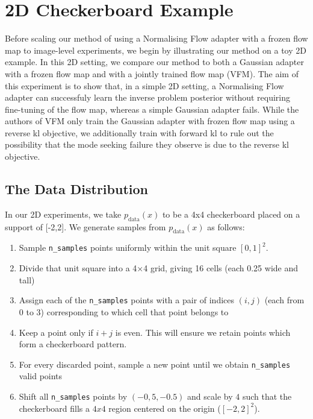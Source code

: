 \documentclass[12pt,a4paper]{report}
\begin{document}
\section{2D Checkerboard Example}
Before scaling our method of using a Normalising Flow adapter with a frozen flow map to image-level experiments, we begin by illustrating our method on a toy 2D example. 
In this 2D setting, we compare our method to both a Gaussian adapter with a frozen flow map and with a jointly trained flow map (VFM). 
The aim of this experiment is to show that, in a simple 2D setting, a Normalising Flow adapter can successfuly learn the inverse problem posterior without requiring fine-tuning of the flow map, whereas a simple Gaussian adapter fails. 
While the authors of VFM only train the Gaussian adapter with frozen flow map using a reverse kl objective, we additionally train with forward kl to rule out the possibility that the mode seeking failure they observe is due to the reverse kl objective. 

\subsection{The Data Distribution}
In our 2D experiments, we take $p_\text{data}(x)$ to be a 4x4 checkerboard placed on a support of [-2,2]. 
We generate samples from $p_\text{data}(x)$ as follows: 
\begin{enumerate}
    \item Sample \texttt{n\_samples} points uniformly within the unit square $[0,1]^2$. 
    \item Divide that unit square into a 4×4 grid, giving 16 cells (each 0.25 wide and tall)
    \item Assign each of the \texttt{n\_samples} points with a pair of indices $(i,j)$ (each from 0 to 3) corresponding to which cell that point belongs to
    \item Keep a point only if $i+j$ is even. This will ensure we retain points which form a checkerboard pattern. 
    \item For every discarded point, sample a new point until we obtain \texttt{n\_samples} valid points 
    \item Shift all \texttt{n\_samples} points by $(-0,5, -0.5)$ and scale by $4$ such that the checkerboard fills a $4x4$ region centered on the origin ($[-2,2]^2$). 
\end{enumerate}
\end{document}
